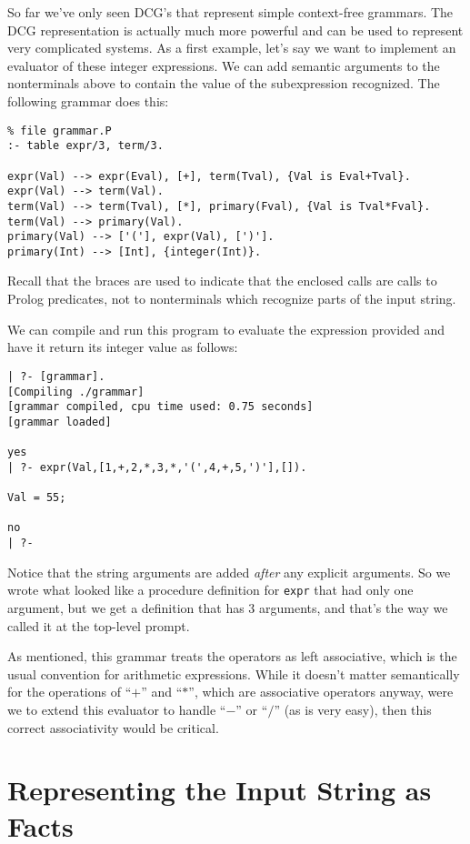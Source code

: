So far we've only seen DCG's that represent simple context-free
grammars.  The DCG representation is actually much more powerful and
can be used to represent very complicated systems.  As a first
example, let's say we want to implement an evaluator of these integer
expressions.  We can add semantic arguments to the nonterminals above
to contain the value of the subexpression recognized.  The following
grammar does this:
\begin{verbatim}
% file grammar.P
:- table expr/3, term/3.

expr(Val) --> expr(Eval), [+], term(Tval), {Val is Eval+Tval}.
expr(Val) --> term(Val).
term(Val) --> term(Tval), [*], primary(Fval), {Val is Tval*Fval}.
term(Val) --> primary(Val).
primary(Val) --> ['('], expr(Val), [')'].
primary(Int) --> [Int], {integer(Int)}.
\end{verbatim}
Recall that the braces are used to indicate that the enclosed calls
are calls to Prolog predicates, not to nonterminals which recognize
parts of the input string.

We can compile and run this program to evaluate the expression
provided and have it return its integer value as follows:
\begin{verbatim}
| ?- [grammar].
[Compiling ./grammar]
[grammar compiled, cpu time used: 0.75 seconds]
[grammar loaded]

yes
| ?- expr(Val,[1,+,2,*,3,*,'(',4,+,5,')'],[]).

Val = 55;

no
| ?- 
\end{verbatim}
Notice that the string arguments are added {\em after} any explicit
arguments.  So we wrote what looked like a procedure definition for
\verb|expr| that had only one argument, but we get a definition that
has 3 arguments, and that's the way we called it at the top-level
prompt.

As mentioned, this grammar treats the operators as left associative,
which is the usual convention for arithmetic expressions.  While it
doesn't matter semantically for the operations of ``$+$'' and ``$*$'',
which are associative operators anyway, were we to extend this
evaluator to handle ``$-$'' or ``$/$'' (as is very easy), then this
correct associativity would be critical.

\section{Representing the Input String as Facts}

